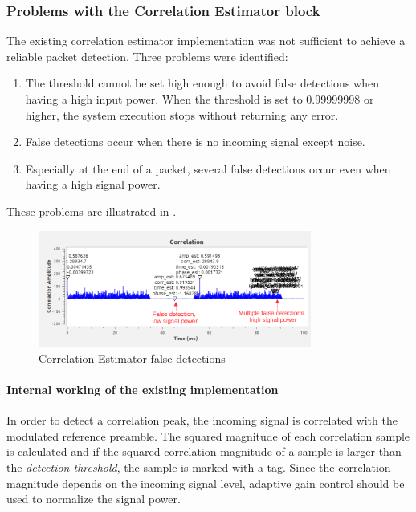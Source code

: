 \subsubsection{Problems with the Correlation Estimator block}
The existing correlation estimator implementation was not sufficient to achieve a reliable packet detection. Three problems were identified:
\begin{enumerate}
\item The threshold cannot be set high enough to avoid false detections when having a high input power. When the threshold is set to 0.99999998 or higher, the system execution stops without returning any error.
\item False detections occur when there is no incoming signal except noise. 
\item Especially at the end of a packet, several false detections occur even when having a high signal power.
\end{enumerate}
These problems are illustrated in .

\begin{figure}[H]
    \centering
    \includegraphics[width=0.8\textwidth]{img_commchain/corr_est_false2.png}
    \caption{Correlation Estimator false detections}
    \label{fig:corr_est_false2}
\end{figure}




\paragraph*{Internal working of the existing implementation }

In order to detect a correlation peak, the incoming signal is correlated with the modulated reference preamble. The squared magnitude of each correlation sample is calculated and if the squared correlation magnitude of a sample is larger than the \textit{detection threshold}, the sample is marked with a tag. Since the correlation magnitude depends on the incoming signal level, adaptive gain control should be used to normalize the signal power.\medskip

